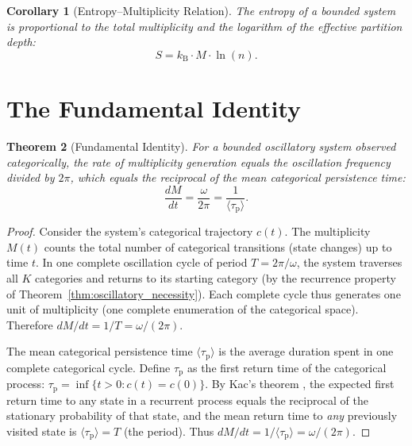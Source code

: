 \documentclass[11pt,twocolumn,a4paper]{article}
\newtheorem{theorem}{Theorem}[section]
\newtheorem{corollary}[theorem]{Corollary}
\newcommand{\kb}{k_{\mathrm{B}}}
\newcommand{\taup}{\tau_{\mathrm{p}}}
\begin{document}
\begin{corollary}[Entropy--Multiplicity Relation]
\label{cor:entropy_multiplicity}
The entropy of a bounded system is proportional to the total
multiplicity and the logarithm of the effective partition depth:
\begin{equation}
\label{eq:S_M_n}
  S = \kb \cdot M \cdot \ln(n).
\end{equation}
\end{corollary}


\section{The Fundamental Identity}
\label{sec:fundamental_identity}

\begin{theorem}[Fundamental Identity]
\label{thm:fundamental}
For a bounded oscillatory system observed categorically, the rate of
multiplicity generation equals the oscillation frequency divided by
$2\pi$, which equals the reciprocal of the mean categorical persistence
time:
\begin{equation}
\label{eq:fundamental}
  \frac{dM}{dt} = \frac{\omega}{2\pi} = \frac{1}{\langle\taup\rangle}.
\end{equation}
\end{theorem}

\begin{proof}
Consider the system's categorical trajectory $c(t)$. The multiplicity
$M(t)$ counts the total number of categorical transitions (state changes)
up to time $t$. In one complete oscillation cycle of period
$T = 2\pi/\omega$, the system traverses all $K$ categories and returns
to its starting category (by the recurrence property of
Theorem~\ref{thm:oscillatory_necessity}). Each complete cycle thus
generates one unit of multiplicity (one complete enumeration of the
categorical space). Therefore $dM/dt = 1/T = \omega/(2\pi)$.

The mean categorical persistence time $\langle\taup\rangle$ is the
average duration spent in one complete categorical cycle. Define
$\taup$ as the first return time of the categorical process:
$\taup = \inf\{t > 0 : c(t) = c(0)\}$. By Kac's theorem
\citep{kac1947}, the expected first return time to any state in a
recurrent process equals the reciprocal of the stationary probability
of that state, and the mean return time to \emph{any} previously visited
state is $\langle\taup\rangle = T$ (the period). Thus
$dM/dt = 1/\langle\taup\rangle = \omega/(2\pi)$.
\end{proof}
\end{document}
